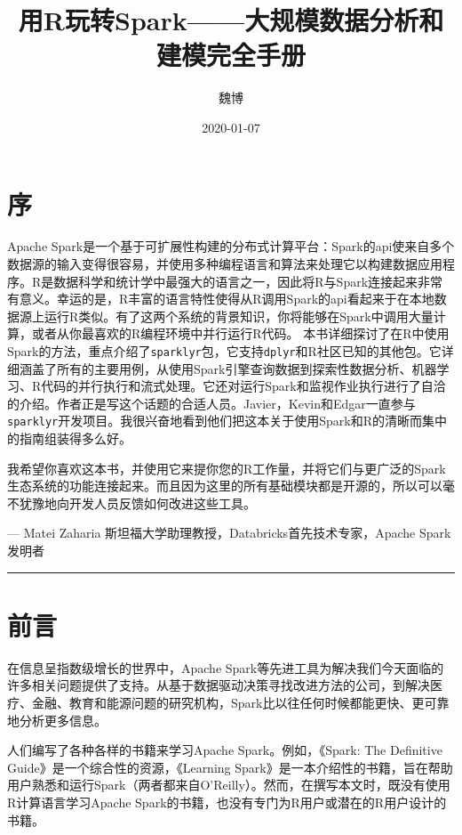 \documentclass[
]{article}
\title{用R玩转Spark------大规模数据分析和建模完全手册}
\author{魏博}
\date{2020-01-07}
\begin{document}
\maketitle

{
\setcounter{tocdepth}{2}
\tableofcontents
}
\hypertarget{ux5e8f}{%
\section{序}\label{ux5e8f}}

Apache
Spark是一个基于可扩展性构建的分布式计算平台：Spark的api使来自多个数据源的输入变得很容易，并使用多种编程语言和算法来处理它以构建数据应用程序。R是数据科学和统计学中最强大的语言之一，因此将R与Spark连接起来非常有意义。幸运的是，R丰富的语言特性使得从R调用Spark的api看起来于在本地数据源上运行R类似。有了这两个系统的背景知识，你将能够在Spark中调用大量计算，或者从你最喜欢的R编程环境中并行运行R代码。
本书详细探讨了在R中使用Spark的方法，重点介绍了\texttt{sparklyr}包，它支持\texttt{dplyr}和R社区已知的其他包。它详细涵盖了所有的主要用例，从使用Spark引擎查询数据到探索性数据分析、机器学习、R代码的并行执行和流式处理。它还对运行Spark和监视作业执行进行了自洽的介绍。作者正是写这个话题的合适人员。Javier，Kevin和Edgar一直参与\texttt{sparklyr}开发项目。我很兴奋地看到他们把这本关于使用Spark和R的清晰而集中的指南组装得多么好。

我希望你喜欢这本书，并使用它来提你您的R工作量，并将它们与更广泛的Spark生态系统的功能连接起来。而且因为这里的所有基础模块都是开源的，所以可以毫不犹豫地向开发人员反馈如何改进这些工具。

--- Matei Zaharia 斯坦福大学助理教授，Databricks首先技术专家，Apache
Spark发明者

\begin{center}\rule{0.5\linewidth}{\linethickness}\end{center}

\hypertarget{ux524dux8a00}{%
\section{前言}\label{ux524dux8a00}}

在信息呈指数级增长的世界中，Apache
Spark等先进工具为解决我们今天面临的许多相关问题提供了支持。从基于数据驱动决策寻找改进方法的公司，到解决医疗、金融、教育和能源问题的研究机构，Spark比以往任何时候都能更快、更可靠地分析更多信息。

人们编写了各种各样的书籍来学习Apache Spark。例如，《Spark: The
Definitive Guide》是一个综合性的资源，《Learning
Spark》是一本介绍性的书籍，旨在帮助用户熟悉和运行Spark（两者都来自O'Reilly）。然而，在撰写本文时，既没有使用R计算语言学习Apache
Spark的书籍，也没有专门为R用户或潜在的R用户设计的书籍。
\end{document}
